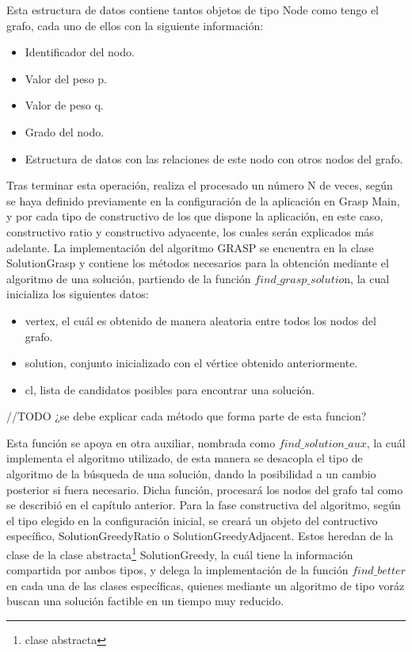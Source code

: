 Esta estructura de datos contiene tantos objetos de tipo Node como tengo el grafo, cada uno de ellos con la siguiente información:
 \begin{itemize}
	\item Identificador del nodo.
	\item Valor del peso p.
	\item Valor de peso q.
	\item Grado del nodo.
	\item Estructura de datos con las relaciones de este nodo con otros nodos del grafo.
\end{itemize}

Tras terminar esta operación, realiza el procesado un número N de veces, según se haya definido previamente en la configuración de la aplicación en Grasp Main, y por cada tipo de constructivo de los que dispone la aplicación, en este caso, constructivo ratio y constructivo adyacente, los cuales serán explicados más adelante. 
La implementación del algoritmo GRASP se encuentra en la clase SolutionGrasp y contiene los métodos necesarios para la obtención mediante el algoritmo de una solución, partiendo de la función $find\_grasp\_solutio$n, la cual inicializa los siguientes datos:
\begin{itemize}
	\item vertex, el cuál es obtenido de manera aleatoria entre todos los nodos del grafo.
	\item solution, conjunto inicializado con el vértice obtenido anteriormente.
	\item cl, lista de candidatos posibles para encontrar una solución.
\end{itemize}

//TODO ¿se debe explicar cada método que forma parte de esta funcion?

Esta función se apoya en otra auxiliar, nombrada como $ find\_solution\_aux $, la cuál implementa el algoritmo utilizado, de esta manera se desacopla el tipo de algoritmo de la búsqueda de una solución, dando la posibilidad a un cambio posterior si fuera necesario. Dicha función, procesará los nodos del grafo tal como se describió en el capítulo anterior. Para la fase constructiva del algoritmo, según el tipo elegido en la configuración inicial, se creará un objeto del contructivo específico, SolutionGreedyRatio o SolutionGreedyAdjacent. Estos heredan de la clase de la clase abstracta\footnote{clase abstracta} SolutionGreedy, la cuál tiene la información compartida por ambos tipos, y delega la implementación de la función $find\_better$ en cada una de las clases específicas, quienes mediante un algoritmo de tipo voráz buscan una solución factible en un tiempo muy reducido.

